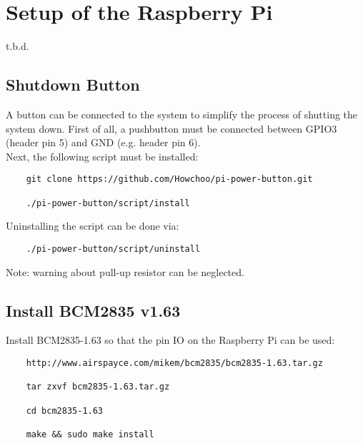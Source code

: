 \section{Setup of the Raspberry Pi}
t.b.d.

\subsection{Shutdown Button}
	

A button can be connected to the system to simplify the process of shutting the system down. First of all, a pushbutton must be connected between GPIO3 (header pin 5) and GND (e.g. header pin 6). \\

Next, the following script must be installed:

\begin{verbatim}
	git clone https://github.com/Howchoo/pi-power-button.git
	
	./pi-power-button/script/install
\end{verbatim}

Uninstalling the script can be done via:

\begin{verbatim}
	./pi-power-button/script/uninstall
\end{verbatim}

Note: warning about pull-up resistor can be neglected.

\subsection{Install BCM2835 v1.63}
Install BCM2835-1.63 so that the pin IO on the Raspberry Pi can be used:
\begin{verbatim}
	http://www.airspayce.com/mikem/bcm2835/bcm2835-1.63.tar.gz 
	
	tar zxvf bcm2835-1.63.tar.gz
	
	cd bcm2835-1.63
	
	make && sudo make install
\end{verbatim}

